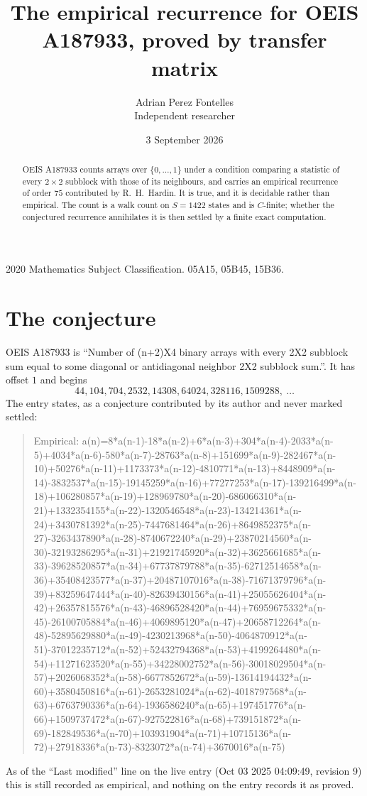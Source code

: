 \documentclass[11pt,a4paper]{article}
\title{The empirical recurrence for OEIS A187933, proved by transfer matrix}
\author{Adrian Perez Fontelles\\ \small Independent researcher}
\date{3 September 2026}
\theoremstyle{plain}
\theoremstyle{definition}
\begin{document}
\maketitle

\begin{abstract}
OEIS A187933 counts arrays over $\{0,\dots,1\}$ under a condition comparing a statistic of
every $2\times2$ subblock with those of its neighbours, and carries an empirical recurrence
of order $75$ contributed by R.~H.~Hardin. It is true, and it is decidable rather than
empirical. The count is a walk count on $S=1422$ states and is $C$-finite; whether the
conjectured recurrence annihilates it is then settled by a finite exact computation.
\end{abstract}

\noindent\small 2020 Mathematics Subject Classification. 05A15, 05B45, 15B36.\normalsize

\section{The conjecture}

OEIS A187933 is ``Number of (n+2)X4 binary arrays with every 2X2 subblock sum equal to some diagonal or antidiagonal neighbor 2X2 subblock sum.''. It has offset $1$ and begins
\[
44, 104, 704, 2532, 14308, 64024, 328116, 1509288,\ \dots
\]
The entry states, as a conjecture contributed by its author and never marked settled:
\begin{quote}
Empirical: a(n)=8*a(n-1)-18*a(n-2)+6*a(n-3)+304*a(n-4)-2033*a(n-5)+4034*a(n-6)-580*a(n-7)-28763*a(n-8)+151699*a(n-9)-282467*a(n-10)+50276*a(n-11)+1173373*a(n-12)-4810771*a(n-13)+8448909*a(n-14)-3832537*a(n-15)-19145259*a(n-16)+77277253*a(n-17)-139216499*a(n-18)+106280857*a(n-19)+128969780*a(n-20)-686066310*a(n-21)+1332354155*a(n-22)-1320546548*a(n-23)-134214361*a(n-24)+3430781392*a(n-25)-7447681464*a(n-26)+8649852375*a(n-27)-3263437890*a(n-28)-8740672240*a(n-29)+23870214560*a(n-30)-32193286295*a(n-31)+21921745920*a(n-32)+3625661685*a(n-33)-39628520857*a(n-34)+67737879788*a(n-35)-62712514658*a(n-36)+35408423577*a(n-37)+20487107016*a(n-38)-71671379796*a(n-39)+83259647444*a(n-40)-82639430156*a(n-41)+25055626404*a(n-42)+26357815576*a(n-43)-46896528420*a(n-44)+76959675332*a(n-45)-26100705884*a(n-46)+4069895120*a(n-47)+20658712264*a(n-48)-52895629880*a(n-49)-4230213968*a(n-50)-4064870912*a(n-51)-37012235712*a(n-52)+52432794368*a(n-53)+4199264480*a(n-54)+11271623520*a(n-55)+34228002752*a(n-56)-30018029504*a(n-57)+2026068352*a(n-58)-6677852672*a(n-59)-13614194432*a(n-60)+3580450816*a(n-61)-2653281024*a(n-62)-4018797568*a(n-63)+6763790336*a(n-64)-1936586240*a(n-65)+197451776*a(n-66)+1509737472*a(n-67)-927522816*a(n-68)+739151872*a(n-69)-182849536*a(n-70)+103931904*a(n-71)+10715136*a(n-72)+27918336*a(n-73)-8323072*a(n-74)+3670016*a(n-75)
\end{quote}
As of the ``Last modified'' line on the live entry (Oct 03 2025 04:09:49, revision 9) this is still
recorded as empirical, and nothing on the entry records it as proved.
\end{document}
